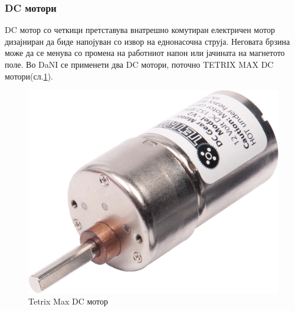 \documentclass[12pt]{article}
\begin{document}
	  \subsubsection{DC мотори}
		  DC мотор со четкици претставува внатрешно комутиран електричен мотор дизајниран да биде напојуван со извор на еднонасочна струја. Неговата брзина може да се менува со промена на работниот напон или јачината на магнетото поле.
		  Во DaNI се применети два DC мотори, поточно TETRIX MAX DC мотори(сл.\ref{fig:dc_motor_iso.png}).

		  \begin{figure}[H]
    	  \includegraphics[width=0.35\linewidth]{./images/dc_motor_iso.png}
			  \centering
			  \caption{Tetrix Max DC мотор}
			  \label{fig:dc_motor_iso.png}
			  \end{figure}
\end{document}
